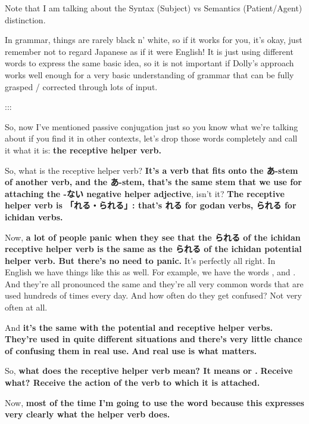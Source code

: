 Note that I am talking about the Syntax (Subject) vs Semantics (Patient/Agent) distinction.

In grammar, things are rarely black n' white, so if it works for you, it's okay, just remember not to regard Japanese as if it were English! It is just using different words to express the same basic idea, so it is not important if Dolly's approach works well enough for a very basic understanding of grammar that can be fully grasped / corrected through lots of input.

:::

\startsectionlevel[title={The Receptive / Passive},reference={the-receptive-passive}]

So, now I've mentioned passive conjugation just so you know what we're talking about if you find it in other contexts, let's drop those words completely and call it what it is: {\bf the receptive helper verb.}

So, what is the receptive helper verb? {\bf It's a verb that fits onto the あ-stem of another verb, and the あ-stem, that's the same stem that we use for attaching the -ない negative helper adjective}, isn't it? {\bf The receptive helper verb is 「れる・られる」: that's れる for godan verbs, られる for ichidan verbs.}

{}

Now, {\bf a lot of people panic when they see that the られる of the ichidan receptive helper verb is the same as the られる of the ichidan potential helper verb. But there's no need to panic.} It's perfectly all right. In English we have things like this as well. For example, we have the words ,  and . And they're all pronounced the same and they're all very common words that are used hundreds of times every day. And how often do they get confused? Not very often at all.

And {\bf it's the same with the potential and receptive helper verbs. They're used in quite different situations and there's very little chance of confusing them in real use.} {\bf And real use is what matters.}

\thinrule

So, {\bf what does the receptive helper verb mean? It means  or .} {\bf Receive what? Receive the action of the verb to which it is attached.}

{}

Now, {\bf most of the time I'm going to use the word  because this expresses very clearly what the helper verb does.}

